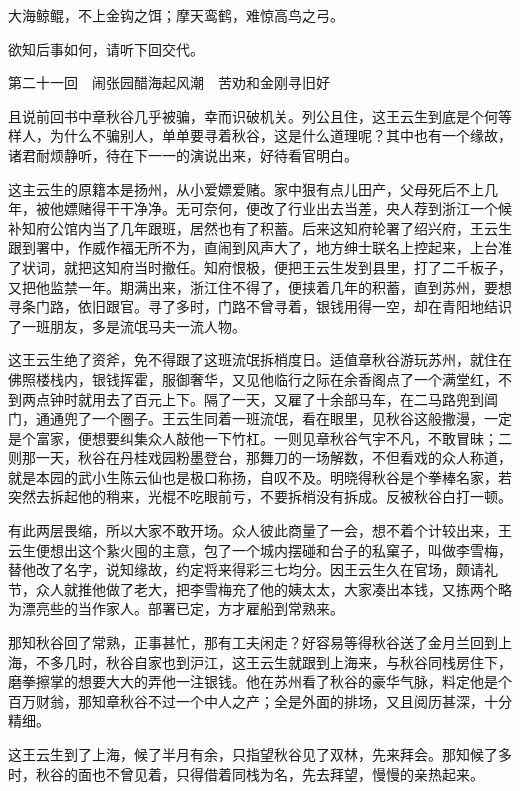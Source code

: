 \documentclass[12pt,UTF8]{ctexbook}
\begin{document}
{{{大海鲸鲲，不上金钩之饵；摩天鸾鹤，难惊高鸟之弓。

欲知后事如何，请听下回交代。





第二十一回　闹张园醋海起风潮　苦劝和金刚寻旧好





且说前回书中章秋谷几乎被骗，幸而识破机关。列公且住，这王云生到底是个何等样人，为什么不骗别人，单单要寻着秋谷，这是什么道理呢？其中也有一个缘故，诸君耐烦静听，待在下一一的演说出来，好待看官明白。

这主云生的原籍本是扬州，从小爱嫖爱赌。家中狠有点儿田产，父母死后不上几年，被他嫖赌得干干净净。无可奈何，便改了行业出去当差，央人荐到浙江一个候补知府公馆内当了几年跟班，居然也有了积蓄。后来这知府轮署了绍兴府，王云生跟到署中，作威作福无所不为，直闹到风声大了，地方绅士联名上控起来，上台准了状词，就把这知府当时撤任。知府恨极，便把王云生发到县里，打了二千板子，又把他监禁一年。期满出来，浙江住不得了，便挟着几年的积蓄，直到苏州，要想寻条门路，依旧跟官。寻了多时，门路不曾寻着，银钱用得一空，却在青阳地结识了一班朋友，多是流氓马夫一流人物。

这王云生绝了资斧，免不得跟了这班流氓拆梢度日。适值章秋谷游玩苏州，就住在佛照楼栈内，银钱挥霍，服御奢华，又见他临行之际在余香阁点了一个满堂红，不到两点钟时就用去了百元上下。隔了一天，又雇了十余部马车，在二马路兜到阊门，通通兜了一个圈子。王云生同着一班流氓，看在眼里，见秋谷这般撒漫，一定是个富家，便想要纠集众人敲他一下竹杠。一则见章秋谷气宇不凡，不敢冒昧；二则那一天，秋谷在丹桂戏园粉墨登台，那舞刀的一场解数，不但看戏的众人称道，就是本园的武小生陈云仙也是极口称扬，自叹不及。明晓得秋谷是个拳棒名家，若突然去拆起他的稍来，光棍不吃眼前亏，不要拆梢没有拆成。反被秋谷白打一顿。

有此两层畏缩，所以大家不敢开场。众人彼此商量了一会，想不着个计较出来，王云生便想出这个紥火囤的主意，包了一个城内摆碰和台子的私窠子，叫做李雪梅，替他改了名字，说知缘故，约定将来得彩三七均分。因王云生久在官场，颇请礼节，众人就推他做了老大，把李雪梅充了他的姨太太，大家凑出本钱，又拣两个略为漂亮些的当作家人。部署已定，方才雇船到常熟来。

那知秋谷回了常熟，正事甚忙，那有工夫闲走？好容易等得秋谷送了金月兰回到上海，不多几时，秋谷自家也到沪江，这王云生就跟到上海来，与秋谷同栈房住下，磨拳擦掌的想要大大的弄他一注银钱。他在苏州看了秋谷的豪华气脉，料定他是个百万财翁，那知章秋谷不过一个中人之产；全是外面的排场，又且阅历甚深，十分精细。

这王云生到了上海，候了半月有余，只指望秋谷见了双林，先来拜会。那知候了多时，秋谷的面也不曾见着，只得借着同栈为名，先去拜望，慢慢的亲热起来。

}}}
\end{document}
